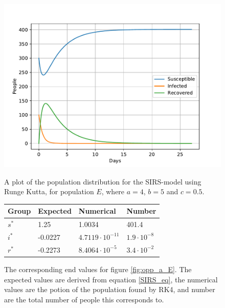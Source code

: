 \documentclass[a4paper]{article}
\begin{document}
	\begin{figure}[!htb]
		\centering
		\begin{minipage}{0.49\textwidth}
			\centering
			\includegraphics[scale=0.6]{../plots/opp_a_E.pdf}
			\caption{A plot of the population distribution for the SIRS-model using Runge Kutta, for population $E$, where $a=4$, $b=5$ and $c=0.5$. }\label{fig:opp_a_E}
		\end{minipage}
		\begin{minipage}{0.49\textwidth}
			\centering
			\captionsetup{type=table} %
			\begin{tabular}{|l|l|l|l|}
				\hline
				Group & Expected & Numerical   & Number  \\ \hline
				$s^*$ & 1.25 & 1.0034 & 401.4 \\ \hline
				$i^*$ & -0.0227 & $4.7119\cdot 10^{-11}$ & $1.9\cdot 10^{-8}$ \\ \hline
				$r^*$ & -0.2273 & $8.4064\cdot 10^{-5}$ & $3.4\cdot 10^{-2}$ \\ \hline
			\end{tabular}
			\caption{The corresponding end values for figure \ref{fig:opp_a_E}. The expected values are derived from equation \ref{SIRS_eq}, the numerical values are the potion of the population found by RK4, and number are the total number  of people this corresponds to.}\label{tab:opp_a_E}
		\end{minipage}
	\end{figure}
	
	
\end{document}
